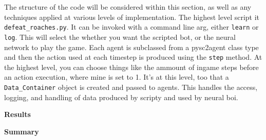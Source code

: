 \documentclass{amsart}
\theoremstyle{definition}
\begin{document}
The structure of the code will be considered within this section, as well as any techniques applied at various levels of implementation.
The highest level script it {\tt defeat\_roaches.py}.
It can be invoked with a command line arg, either {\tt learn} or {\tt log}.
This will select the whether you want the scripted bot, or the neural network to play the game.
Each agent is subclassed from a pysc2agent class type and then the action used at each timestep is produced using the {\tt step} method.
At the highest level, you can choose things like the ammount of ingame steps before an action execution, where mine is set to 1.
It's at this level, too that a {\tt Data\_Container} object is created and passed to agents.
This handles the access, logging, and handling of data produced by scripty and used by neural boi.













\textbf{Results}











\textbf{Summary}

\end{document}
